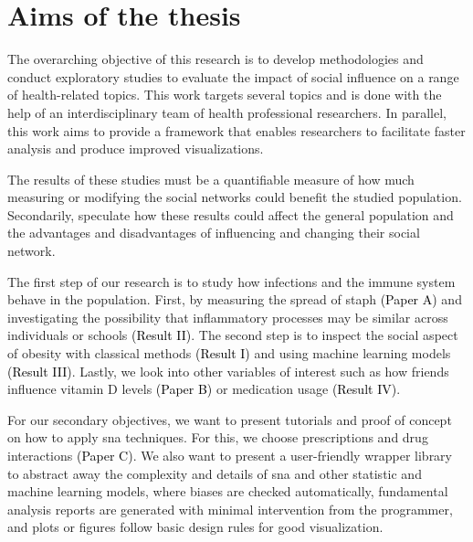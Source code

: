 \chapter{Aims of the thesis}\label{ch:aims}




The overarching objective of this research is to develop methodologies and conduct exploratory studies to  evaluate the impact of social influence on a range of health-related topics. This work targets several topics and is done with the help of an interdisciplinary team of health professional researchers. In parallel, this work aims to provide a framework that enables researchers to facilitate faster analysis and produce improved visualizations. 


The results of these studies must be a quantifiable measure of how much measuring or modifying the social networks could benefit the studied population. Secondarily, speculate how these results could affect the general population and the advantages and disadvantages of influencing and changing their social network.


The first step of our research is to study how infections and the immune system behave in the population. First, by measuring the spread of \gls{staph} \colorbox{PaperColor}{\textcolor{black}{(Paper A)}} and investigating the possibility that inflammatory processes may be similar across individuals or schools \colorbox{ResultColor}{\textcolor{black}{(Result II)}}. The second step is to inspect the social aspect of obesity with classical methods \colorbox{ResultColor}{\textcolor{black}{(Result I)}} and using machine learning models \colorbox{ResultColor}{\textcolor{black}{(Result III)}}. Lastly, we look into other variables of interest such as how friends influence vitamin D levels \colorbox{PaperColor}{\textcolor{black}{(Paper B)}} or medication usage \colorbox{ResultColor}{\textcolor{black}{(Result IV)}}.

For our secondary objectives, we want to present tutorials and proof of concept on how to apply \gls{sna} techniques. For this, we choose prescriptions and drug interactions \colorbox{PaperColor}{\textcolor{black}{(Paper C)}}. We also want to present a user-friendly wrapper library to abstract away the complexity and details of \gls{sna} and other statistic and machine learning models, where biases are checked automatically, fundamental analysis reports are generated with minimal intervention from the programmer, and plots or figures follow basic design rules for good visualization.

